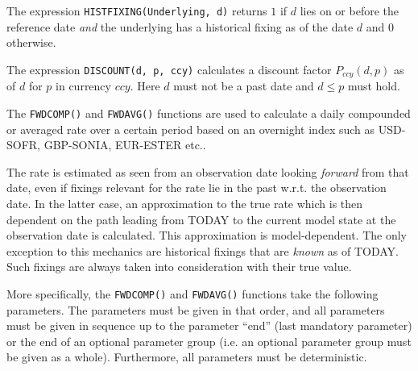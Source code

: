\label{function_histfixing}

The expression {\tt HISTFIXING(Underlying, d)} returns $1$ if $d$ lies on or before the reference date {\em and} the
underlying has a historical fixing as of the date $d$ and $0$ otherwise.

\label{function_discount}

The expression {\tt DISCOUNT(d, p, ccy)} calculates a discount factor $P_{ccy}(d,p)$ as of $d$ for $p$ in currency
$ccy$. Here $d$ must not be a past date and $d\leq p$ must hold.

\label{function_fwdcomp}

The {\tt FWDCOMP()} and {\tt FWDAVG()} functions are used to calculate a daily compounded or averaged rate over a
certain period based on an overnight index such as USD-SOFR, GBP-SONIA, EUR-ESTER etc..

The rate is estimated as seen from an observation date looking {\em forward} from that date, even if fixings relevant
for the rate lie in the past w.r.t. the observation date. In the latter case, an approximation to the true rate which is
then dependent on the path leading from TODAY to the current model state at the observation date is calculated. This
approximation is model-dependent. The only exception to this mechanics are historical fixings that are {\em known} as of
TODAY. Such fixings are always taken into consideration with their true value.

More specifically, the {\tt FWDCOMP()} and {\tt FWDAVG()} functions take the following parameters. The parameters must
be given in that order, and all parameters must be given in sequence up to the parameter ``end'' (last mandatory
parameter) or the end of an optional parameter group (i.e. an optional parameter group must be given as a
whole). Furthermore, all parameters must be deterministic.

